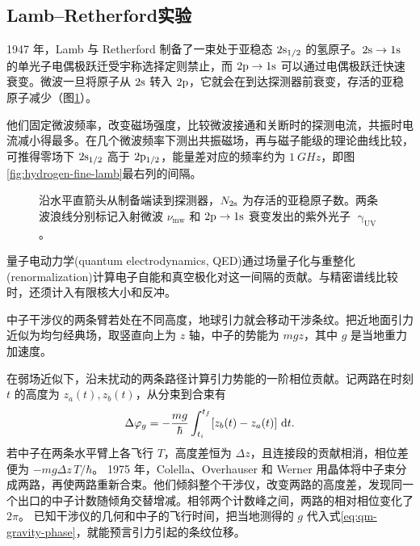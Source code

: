 \subsection{Lamb--Retherford实验}
\label{ss:lamb-experiment}

1947 年，Lamb 与 Retherford 制备了一束处于亚稳态 $2\mathrm{s}_{1/2}$ 的氢原子。$2\mathrm{s} \to 1\mathrm{s}$ 的单光子电偶极跃迁受宇称选择定则禁止，而 $2\mathrm{p} \to 1\mathrm{s}$ 可以通过电偶极跃迁快速衰变。微波一旦将原子从 $2\mathrm{s}$ 转入 $2\mathrm{p}$，它就会在到达探测器前衰变，存活的亚稳原子减少（图\ref{fig:lamb-readout}）。

他们固定微波频率，改变磁场强度，比较微波接通和关断时的探测电流，共振时电流减小得最多。在几个微波频率下测出共振磁场，再与磁子能级的理论曲线比较，可推得零场下 $2\mathrm{s}_{1/2}$ 高于 $2\mathrm{p}_{1/2}$，能量差对应的频率约为 $\qty{1}{GHz}$\cite{lamb}，即图\ref{fig:hydrogen-fine-lamb}最右列的间隔。
\begin{figure}[H]
    \centering{}
    \caption{沿水平直箭头从制备端读到探测器，$N_{2\mathrm{s}}$ 为存活的亚稳原子数。两条波浪线分别标记入射微波 $\nu_{\mathrm{mw}}$ 和 $2\mathrm{p} \to 1\mathrm{s}$ 衰变发出的紫外光子 $\upgamma_{\mathrm{UV}}$。}
    \label{fig:lamb-readout}
\end{figure}

量子电动力学(quantum electrodynamics, QED)通过场量子化与重整化(renormalization)计算电子自能和真空极化对这一间隔的贡献。与精密谱线比较时，还须计入有限核大小和反冲。

\label{sec:qm-gravity}
中子干涉仪的两条臂若处在不同高度，地球引力就会移动干涉条纹。把近地面引力近似为均匀经典场，取竖直向上为 $z$ 轴，中子的势能为 $mgz$，其中 $g$ 是当地重力加速度。

在弱场近似下，沿未扰动的两条路径计算引力势能的一阶相位贡献。记两路在时刻 $t$ 的高度为 $z_a(t),z_b(t)$，从分束到合束有
\begin{equation}\label{eq:qm-gravity-phase}
    \Delta\varphi_g = -\frac{mg}{\hbar}\int_{t_i}^{t_f}
        [z_b(t) - z_a(t)]\,\mathop{}\!\mathrm{d} t .
\end{equation}
若中子在两条水平臂上各飞行 $T$，高度差恒为 $\Delta z$，且连接段的贡献相消，相位差便为 $-mg\Delta z\,T/\hbar$。
1975 年，\label{exp:qm-cow-gravity}Colella、Overhauser 和 Werner 用晶体将中子束分成两路，再使两路重新合束。他们倾斜整个干涉仪，改变两路的高度差，发现同一个出口的中子计数随倾角交替增减。相邻两个计数峰之间，两路的相对相位变化了 $2\pi$\cite{cow-neutrons}。
已知干涉仪的几何和中子的飞行时间，把当地测得的 $g$ 代入式\eqref{eq:qm-gravity-phase}，就能预言引力引起的条纹位移。

